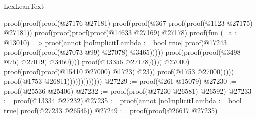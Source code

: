 \begin{lexlean}{LexLeanText}
\begin{coremodule}
                                                                  proof(proof(proof(@27176 @27181)
                                                                        proof(proof(@367
                                                                              proof(proof(@1123
                                                                                    @27175)
                                                                                  @27181))
                                                                            proof(proof(proof(proof(@14633
                                                                                      @27169)
                                                                                    @27178)
                                                                                  proof(fun (_a : @13010) =>
                                                                                    proof(annot [noImplicitLambda := bool true]
                                                                                      proof(@17243
                                                                                          proof(proof(proof(@27073
                                                                                                  @99)
                                                                                                @27078)
                                                                                              @3465)))))
                                                                                proof(proof(proof(@3498
                                                                                        @75)
                                                                                      @27019)
                                                                                    @3450))))
                                                                      proof(@13356 @27178)))))
                                                          @27000)
                                                        proof(proof(proof(@15410 @27000) @1723)
                                                            @23))
                                                      proof(@1753 @27000)))))
                                            proof(@1753 @26811)))))))))))))
@27229 := proof(@261 @15079)
@27230 := proof(@25536 @25406)
@27232 := proof(proof(@27230 @26581) @26592)
@27233 := proof(@13334 @27232)
@27235 := proof(annot [noImplicitLambda := bool true] proof(@27233 @26545))
@27249 := proof(proof(@26617 @27235)

\end{coremodule}
\end{lexlean}
